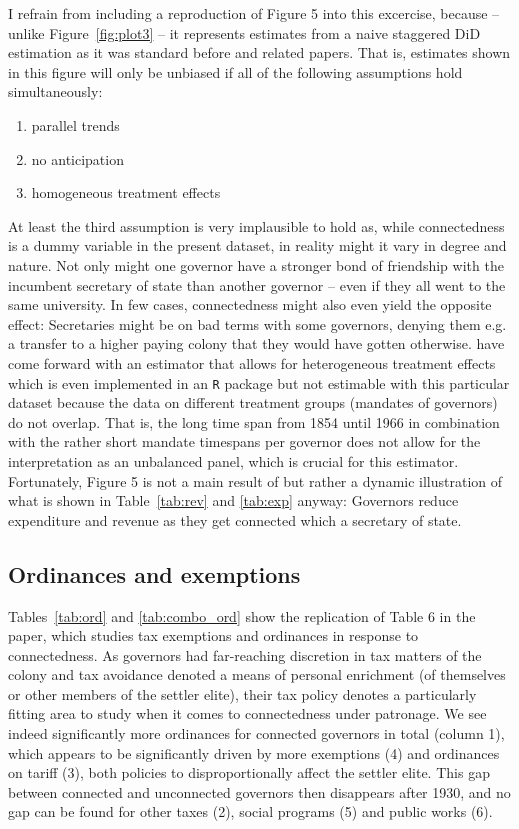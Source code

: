 \documentclass[a4paper]{article}\usepackage[]{graphicx}\usepackage[]{xcolor}
\begin{document}
\hspace*{5mm} I refrain from including a reproduction of Figure 5 into this excercise, because -- unlike Figure~\ref{fig:plot3} -- it represents estimates from a naive staggered DiD estimation as it was standard before \cite{sun2021} and related papers. That is, estimates shown in this figure will only be unbiased if all of the following assumptions hold simultaneously:
\begin{enumerate}
  \item parallel trends
  \item no anticipation
  \item homogeneous treatment effects
\end{enumerate}
\hspace*{5mm} At least the third assumption is very implausible to hold as, while connectedness is a dummy variable in the present dataset, in reality might it vary in degree and nature. Not only might one governor have a stronger bond of friendship with the incumbent secretary of state than another governor -- even if they all went to the same university. In few cases, connectedness might also even yield the opposite effect: Secretaries might be on bad terms with some governors, denying them e.g. a transfer to a higher paying colony that they would have gotten otherwise. \cite{callaway2021} have come forward with an estimator that allows for heterogeneous treatment effects which is even implemented in an \texttt{R} package but not estimable with this particular dataset because the data on different treatment groups (mandates of governors) do not overlap. That is, the long time span from 1854 until 1966 in combination with the rather short mandate timespans per governor does not allow for the interpretation as an unbalanced panel, which is crucial for this estimator. Fortunately, Figure 5 is not a main result of \cite{guoxu2018} but rather a dynamic illustration of what is shown in Table~\ref{tab:rev} and \ref{tab:exp} anyway: Governors reduce expenditure and revenue as they get connected which a secretary of state.    

\subsection{Ordinances and exemptions}
\hspace*{5mm} Tables~\ref{tab:ord} and \ref{tab:combo_ord} show the replication of Table 6 in the paper, which studies tax exemptions and ordinances in response to connectedness. As governors had far-reaching discretion in tax matters of the colony and tax avoidance denoted a means of personal enrichment (of themselves or other members of the settler elite), their tax policy denotes a particularly fitting area to study when it comes to connectedness under patronage. We see indeed significantly more ordinances for connected governors in total (column 1), which appears to be significantly driven by more exemptions (4) and ordinances on tariff (3), both policies to disproportionally affect the settler elite. This gap between connected and unconnected governors then disappears after 1930, and no gap can be found for other taxes (2), social programs (5) and public works (6).
\end{document}
